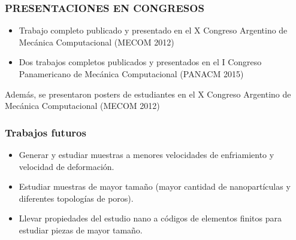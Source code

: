 \begin{frame}
 \frametitle{PRESENTACIONES EN CONGRESOS}
 \vspace{0.2cm}
 \begin{itemize}
  \item Trabajo completo publicado y presentado en el X Congreso Argentino de Mecánica Computacional (MECOM 2012)
  \vspace{0.2cm}
  \item Dos trabajos completos publicados y presentados en el I Congreso Panamericano de Mecánica Computacional (PANACM 2015)
 \end{itemize}
  \vspace{0.5cm}
  Además, se presentaron posters de estudiantes en el X Congreso Argentino de Mecánica Computacional (MECOM 2012) 
\end{frame}


\begin{frame}
 \frametitle{Trabajos futuros}
 \vspace{0.5cm}
 \begin{itemize}
  \item Generar y estudiar muestras a menores velocidades de enfriamiento y velocidad de deformación.
  \vspace{0.5cm}
  \item Estudiar muestras de mayor tamaño (mayor cantidad de nanopartículas y diferentes topologías de poros).
  \vspace{0.5cm}
  \item Llevar propiedades del estudio nano a códigos de elementos finitos para estudiar piezas de mayor tamaño.
 \end{itemize}
\end{frame}

